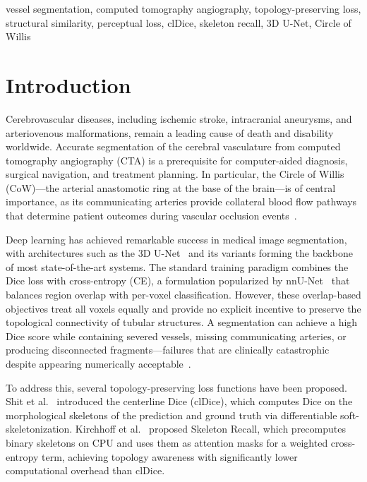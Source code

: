 \documentclass[conference]{IEEEtran}
\begin{document}
\begin{abstract}
\end{abstract}

\begin{IEEEkeywords}
vessel segmentation, computed tomography angiography, topology-preserving loss, structural similarity, perceptual loss, clDice, skeleton recall, 3D U-Net, Circle of Willis
\end{IEEEkeywords}

\section{Introduction}

Cerebrovascular diseases, including ischemic stroke, intracranial aneurysms, and arteriovenous malformations, remain a leading cause of death and disability worldwide. Accurate segmentation of the cerebral vasculature from computed tomography angiography (CTA) is a prerequisite for computer-aided diagnosis, surgical navigation, and treatment planning. In particular, the Circle of Willis (CoW)---the arterial anastomotic ring at the base of the brain---is of central importance, as its communicating arteries provide collateral blood flow pathways that determine patient outcomes during vascular occlusion events~\cite{yang2023}.

Deep learning has achieved remarkable success in medical image segmentation, with architectures such as the 3D U-Net~\cite{isensee2021} and its variants forming the backbone of most state-of-the-art systems. The standard training paradigm combines the Dice loss with cross-entropy (CE), a formulation popularized by nnU-Net~\cite{isensee2024} that balances region overlap with per-voxel classification. However, these overlap-based objectives treat all voxels equally and provide no explicit incentive to preserve the topological connectivity of tubular structures. A segmentation can achieve a high Dice score while containing severed vessels, missing communicating arteries, or producing disconnected fragments---failures that are clinically catastrophic despite appearing numerically acceptable~\cite{shit2021}.

To address this, several topology-preserving loss functions have been proposed. Shit et al.~\cite{shit2021} introduced the centerline Dice (clDice), which computes Dice on the morphological skeletons of the prediction and ground truth via differentiable soft-skeletonization. Kirchhoff et al.~\cite{kirchhoff2024} proposed Skeleton Recall, which precomputes binary skeletons on CPU and uses them as attention masks for a weighted cross-entropy term, achieving topology awareness with significantly lower computational overhead than clDice.
\end{document}
